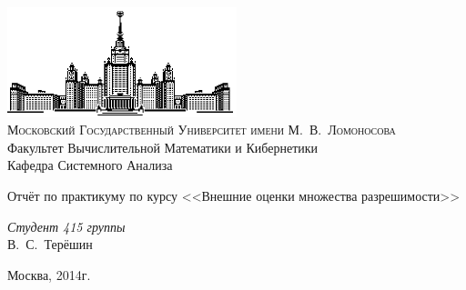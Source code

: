 \documentclass[12pt]{article}
\theoremstyle{rusdef}
\begin{document}
\thispagestyle{empty}

\begin{center}
\ \vspace{-3cm}

\includegraphics[width=0.5\textwidth]{msu.eps}\\

{\scshape Московский Государственный Университет имени М.~В.~Ломоносова}\\
Факультет Вычислительной Математики и Кибернетики\\
Кафедра Системного Анализа
\vfill

{\LARGE Отчёт по практикуму по курсу <<Внешние оценки множества	разрешимости>>}
\vspace{.5cm}

\end{center}

\vspace{1cm}

\begin{flushright}
\large
\textit{Студент 415 группы}\\
В.~С.~Терёшин\\
\vspace{5mm}

\end{flushright}

\vfill
\begin{center}
{\large
Москва, 2014г.}
\end{center}

\newpage
\tableofcontents
\newpage
\end{document}
